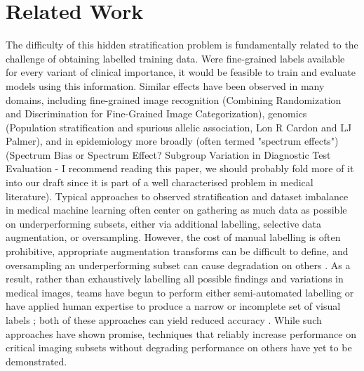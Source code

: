 \documentclass{article}
\begin{document}
\section{Related Work}

The difficulty of this hidden stratification problem is fundamentally related to the challenge of obtaining labelled training data.  
Were fine-grained labels available for every variant of clinical importance, it would be feasible to train and evaluate models using this information.  
Similar effects have been observed in many domains, including fine-grained image recognition (Combining Randomization and Discrimination for Fine-Grained Image Categorization), genomics (Population stratification and spurious allelic association, Lon R Cardon and LJ Palmer), and in epidemiology more broadly (often termed "spectrum effects")(Spectrum Bias or Spectrum Effect? Subgroup Variation in Diagnostic Test Evaluation - I recommend reading this paper, we should probably fold more of it into our draft since it is part of a well characterised problem in medical literature).
Typical approaches to observed stratification and dataset imbalance in medical machine learning often center on gathering as much data as possible on underperforming subsets, either via additional labelling, selective data augmentation, or oversampling\citep{Mazurowski2008-cq}.  
However, the cost of manual labelling is often prohibitive, appropriate augmentation transforms can be difficult to define, and oversampling an underperforming subset can cause degradation on others \citep{Fries2019-ze, Ratner2017-td, Buda2018-ab, Zech2018-xq}.  
As a result, rather than exhaustively labelling all possible findings and variations in medical images, teams have begun to perform either semi-automated labelling \citep{Wang2017-vm, Fries2019-ze, Irvin2019-ho, Dunnmon2019-zw, Fries2019-ze, ADD IN Scene Graph Prediction with Limited Labels}  or have applied human expertise to produce a narrow or incomplete set of visual labels \citep{Rajpurkar2017-rc}; both
of these approaches can yield reduced accuracy \citep{Oakden-Rayner2019-yi}.  
While such approaches have shown promise, techniques that reliably increase performance on critical imaging subsets without degrading performance on others have yet to be demonstrated.
 
\end{document}
